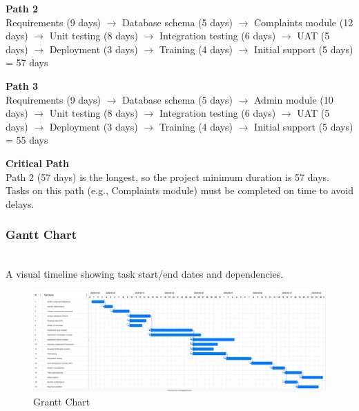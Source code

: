 \documentclass[a4paper,12pt]{article}
\begin{document}
\textbf{Path 2} \\
 Requirements (9 days) $\rightarrow$ Database schema (5 days) $\rightarrow$ Complaints module (12 days) $\rightarrow$ Unit testing (8 days) $\rightarrow$ Integration testing (6 days) $\rightarrow$ UAT (5 days) $\rightarrow$ Deployment (3 days) $\rightarrow$ Training (4 days) $\rightarrow$ Initial support (5 days) = 57 days

\textbf{Path 3} \\
 Requirements (9 days) $\rightarrow$ Database schema (5 days) $\rightarrow$ Admin module (10 days) $\rightarrow$ Unit testing (8 days) $\rightarrow$ Integration testing (6 days) $\rightarrow$ UAT (5 days) $\rightarrow$ Deployment (3 days) $\rightarrow$ Training (4 days) $\rightarrow$ Initial support (5 days) = 55 days


\textbf{Critical Path} \\
Path 2 (57 days) is the longest, so the project minimum duration is 57 days. Tasks on this path (e.g., Complaints module) must be completed on time to avoid delays.

\noindent\subsubsection{Gantt Chart} \\ 
A visual timeline showing task start/end dates and dependencies. 
\begin{figure}[H]
    \centering
    \includegraphics[width=1\linewidth]{photos/grant-chart.png}
    \caption{Grantt Chart}
    \label{fig:enter-label}
\end{figure}
\end{document}
